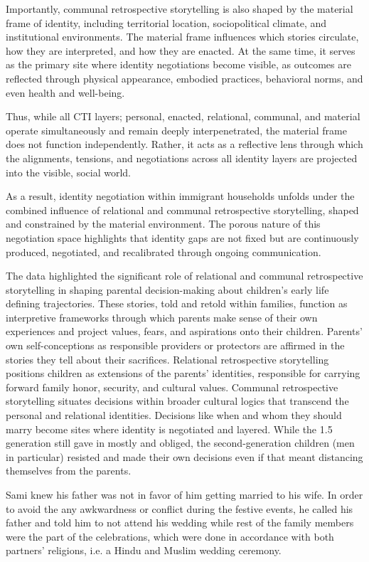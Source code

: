 Importantly, communal retrospective storytelling is also shaped by the material frame of identity, including territorial location, sociopolitical climate, and institutional environments. The material frame influences which stories circulate, how they are interpreted, and how they are enacted. At the same time, it serves as the primary site where identity negotiations become visible, as outcomes are reflected through physical appearance, embodied practices, behavioral norms, and even health and well-being.

Thus, while all CTI layers; personal, enacted, relational, communal, and material operate simultaneously and remain deeply interpenetrated, the material frame does not function independently. Rather, it acts as a reflective lens through which the alignments, tensions, and negotiations across all identity layers are projected into the visible, social world.

As a result, identity negotiation within immigrant households unfolds under the combined influence of relational and communal retrospective storytelling, shaped and constrained by the material environment. The porous nature of this negotiation space highlights that identity gaps are not fixed but are continuously produced, negotiated, and recalibrated through ongoing communication.

 The data highlighted the significant role of relational and communal retrospective storytelling in shaping parental decision-making about children’s early life defining trajectories. These stories, told and retold within families, function as interpretive frameworks through which parents make sense of their own experiences and project values, fears, and aspirations onto their children. Parents’ own self-conceptions as responsible providers or protectors are affirmed in the stories they tell about their sacrifices. Relational retrospective storytelling positions children as extensions of the parents’ identities, responsible for carrying forward family honor, security, and cultural values. Communal retrospective storytelling situates decisions within broader cultural logics that transcend the personal and relational identities. Decisions like when and whom they should marry become sites where identity is negotiated and layered. While the 1.5 generation still gave in mostly and obliged, the second-generation children (men in particular) resisted and made their own decisions even if that meant distancing themselves from the parents.
 
Sami knew his father was not in favor of him getting married to his wife. In order to avoid the any awkwardness or conflict during the festive events, he called his father and told him to not attend his wedding while rest of the family members were the part of the celebrations, which were done in accordance with both partners' religions, i.e. a Hindu and Muslim wedding ceremony.


